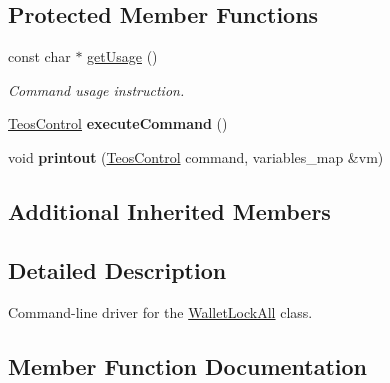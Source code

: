\subsection*{Protected Member Functions}
\begin{DoxyCompactItemize}
\item 
const char $\ast$ \mbox{\hyperlink{classteos_1_1command_1_1_wallet_lock_all_options_ae45881c064f3d14883f3a1fae105603a}{get\+Usage}} ()
\begin{DoxyCompactList}\small\item\em Command \textquotesingle{}usage\textquotesingle{} instruction. \end{DoxyCompactList}\item 
\mbox{\label{classteos_1_1command_1_1_wallet_lock_all_options_ac6ae053d93b6272aa142720cc9020c51}} 
\mbox{\hyperlink{classteos_1_1_teos_control}{Teos\+Control}} {\bfseries execute\+Command} ()
\item 
\mbox{\label{classteos_1_1command_1_1_wallet_lock_all_options_a787263cef86df3559a160bbe3c2507af}} 
void {\bfseries printout} (\mbox{\hyperlink{classteos_1_1_teos_control}{Teos\+Control}} command, variables\+\_\+map \&vm)
\end{DoxyCompactItemize}
\subsection*{Additional Inherited Members}


\subsection{Detailed Description}
Command-\/line driver for the \mbox{\hyperlink{classteos_1_1command_1_1_wallet_lock_all}{Wallet\+Lock\+All}} class. 

\subsection{Member Function Documentation}
\mbox{\label{classteos_1_1command_1_1_wallet_lock_all_options_ae45881c064f3d14883f3a1fae105603a}} 
